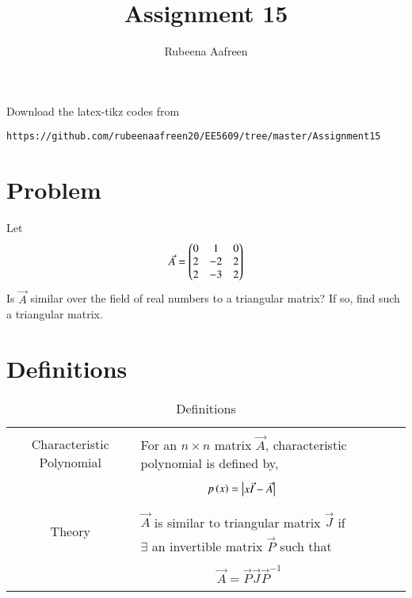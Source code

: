 \documentclass[journal,12pt]{IEEEtran}
\begin{document}
     \def\rightbox#1{\makebox[0in][r]{#1}}
     \def\centbox#1{\makebox[0in]{#1}}
     \def\topbox#1{\raisebox{-\baselineskip}[0in][0in]{#1}}
     \def\midbox#1{\raisebox{-0.5\baselineskip}[0in][0in]{#1}}
\vspace{3cm}
\title{Assignment 15}
\author{Rubeena Aafreen}
\maketitle
\bigskip
\renewcommand{\thefigure}{\theenumi}
\renewcommand{\thetable}{\theenumi}
%
Download the latex-tikz codes from 
%
\begin{lstlisting}
https://github.com/rubeenaafreen20/EE5609/tree/master/Assignment15
\end{lstlisting}
\section{\textbf{Problem}}
%
Let
\begin{align}
    \Vec{A}=\begin{pmatrix}0&1&0\\2&-2&2\\2&-3&2\end{pmatrix}
\end{align}
Is $\vec{A}$ similar over the field of real numbers to a triangular matrix? If so, find such a triangular matrix.
\section{\textbf{Definitions}}
\renewcommand{\thetable}{1}
\begin{table}[ht!]
\centering
\begin{tabular}{|c|l|}
    \hline
	\multirow{3}{*}{Characteristic Polynomial} 
	& \\
	& For an $n\times n$ matrix $\vec{A}$, characteristic polynomial is defined by,\\
	&\\
	& $\qquad\qquad\qquad p\left(x\right)=\begin{vmatrix}x\Vec{I}-\Vec{A}\end{vmatrix}$\\
	&\\
	\hline
	\multirow{3}{*}{Theory}
    &\\
    & $\vec{A}$ is similar to triangular matrix $\vec{J}$ if\\
    & $\exists$ an invertible matrix $\vec{P}$ such that\\
    &\\
    & $\qquad \qquad \qquad \vec{A}=\Vec{P}\vec{J}\vec{P}^{-1}$\\
    &\\
    \hline
\end{tabular}
\label{table:1}
    \caption{Definitions}
\end{table}
\newpage
\end{document}
